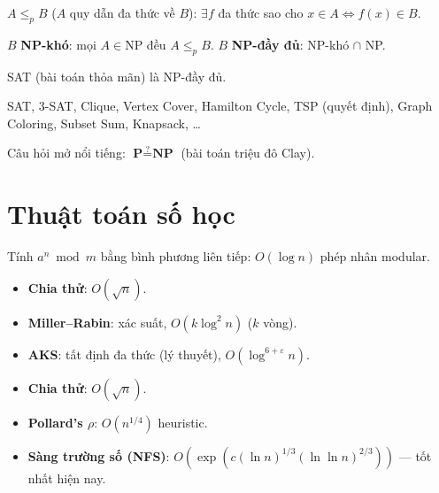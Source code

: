 \documentclass[12pt,a4paper]{article}
\begin{document}
\begin{dinhnghia}[title={Quy dẫn và NP-đầy đủ}]
  $A \le_p B$ ($A$ quy dẫn đa thức về $B$): $\exists f$ đa thức sao cho $x \in A \Leftrightarrow f(x) \in B$.

  $B$ \textbf{NP-khó}: mọi $A \in \text{NP}$ đều $A \le_p B$. $B$ \textbf{NP-đầy đủ}: NP-khó $\cap$ NP.
\end{dinhnghia}

\begin{dinhly}[title={Cook--Levin}]
  SAT (bài toán thỏa mãn) là NP-đầy đủ.
\end{dinhly}

\begin{vidu}[title={Bài toán NP-đầy đủ quan trọng}]
  SAT, 3-SAT, Clique, Vertex Cover, Hamilton Cycle, TSP (quyết định), Graph Coloring, Subset Sum, Knapsack, \ldots
\end{vidu}

\begin{luuy}
  Câu hỏi mở nổi tiếng: $\textbf{P} \overset{?}{=} \textbf{NP}$ (bài toán triệu đô Clay).
\end{luuy}

\section{Thuật toán số học}

\begin{phuongphap}[title={Lũy thừa modular nhanh}]
  Tính $a^n \bmod m$ bằng bình phương liên tiếp: $O(\log n)$ phép nhân modular.
\end{phuongphap}

\begin{phuongphap}[title={Kiểm tra nguyên tố}]
  \begin{itemize}
    \item \textbf{Chia thử}: $O(\sqrt{n})$.
    \item \textbf{Miller--Rabin}: xác suất, $O(k\log^2 n)$ ($k$ vòng).
    \item \textbf{AKS}: tất định đa thức (lý thuyết), $O(\log^{6+\varepsilon} n)$.
  \end{itemize}
\end{phuongphap}

\begin{phuongphap}[title={Phân tích thừa số}]
  \begin{itemize}
    \item \textbf{Chia thử}: $O(\sqrt{n})$.
    \item \textbf{Pollard's $\rho$}: $O(n^{1/4})$ heuristic.
    \item \textbf{Sàng trường số (NFS)}: $O\!\left(\exp\!\left(c(\ln n)^{1/3}(\ln\ln n)^{2/3}\right)\right)$ --- tốt nhất hiện nay.
  \end{itemize}
\end{phuongphap}
\end{document}
